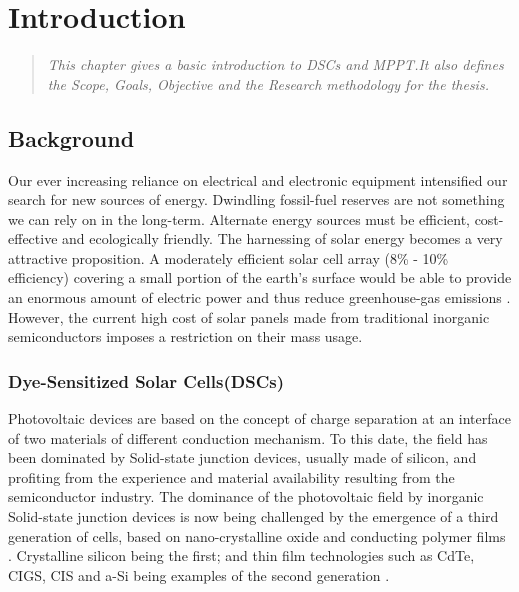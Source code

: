 \chapter{Introduction}
\begin{quote} 
\it This chapter gives a basic introduction to  \ac{DSCs} and \ac{MPPT}.It also defines the Scope, Goals, Objective and the Research methodology for the thesis.
\end{quote}

\section{Background}

Our ever increasing reliance on electrical and electronic equipment intensified our search for new sources of energy. Dwindling fossil-fuel reserves are not something we can rely on in the long-term. Alternate energy sources must be efficient, cost-effective and ecologically friendly. The harnessing of solar energy becomes a very attractive proposition. A moderately efficient solar cell array (8\% - 10\% efficiency) covering a small portion of the earth's surface would be able to provide an enormous amount of electric power and thus reduce greenhouse-gas emissions \cite{kalyanasundaram2010dye}. However, the current high cost of solar panels made from traditional inorganic semiconductors imposes a restriction on their mass usage.
 
 \subsection{Dye-Sensitized Solar Cells(DSCs)}
  Photovoltaic devices are based on the concept of charge separation at an interface of two materials of different conduction mechanism. To this date, the field has been dominated by Solid-state junction devices, usually made of silicon, and profiting from the experience and material availability resulting from the semiconductor industry. The dominance of the photovoltaic field by inorganic Solid-state junction devices is now being challenged by the emergence of a third generation of cells, based on nano-crystalline oxide and conducting polymer films \cite{gratzel2004conversion}. Crystalline silicon being the first; and thin film technologies such as \ac{CdTe}, \ac{CIGS}, \ac{CIS} and \ac{a-Si} being examples of the second generation \cite{toivola2010dye}.\\
  
